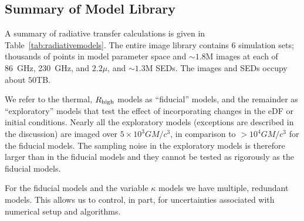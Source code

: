 \subsection{Summary of \sgra Model Library}


A summary of radiative transfer calculations is given in Table~\ref{tab:radiativemodels}. The entire image library contains $6$ simulation sets; thousands of points in model parameter space and $\sim 1.8$M images at each of 86~GHz, 230~GHz, and $2.2\mu$, and $\sim1.3$M SEDs.  The images and SEDs occupy about $50$TB.

We refer to the thermal, $R_\mathrm{high}$ models as ``fiducial'' models, and the remainder as ``exploratory'' models that test the effect of incorporating changes in the eDF or initial conditions.  Nearly all the exploratory models (exceptions are described in the discussion) are imaged over $5 \times 10^3 G M/c^3$, in comparison to $> 10^4 G M/c^3$ for the fiducial models. The sampling noise in the exploratory models is therefore larger than in the fiducial models and they cannot be tested as rigorously as the fiducial models. 

For the fiducial models and the variable $\kappa$ models we have multiple, redundant models.  This allows us to control, in part, for uncertainties associated with numerical setup and algorithms. 

